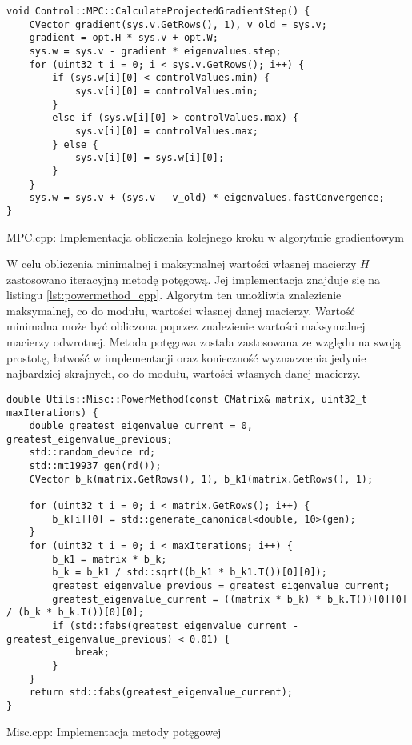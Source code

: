 \begin{listing}[htb]
\begin{verbatim}
void Control::MPC::CalculateProjectedGradientStep() {
    CVector gradient(sys.v.GetRows(), 1), v_old = sys.v;
    gradient = opt.H * sys.v + opt.W;
    sys.w = sys.v - gradient * eigenvalues.step;
    for (uint32_t i = 0; i < sys.v.GetRows(); i++) {
        if (sys.w[i][0] < controlValues.min) {
            sys.v[i][0] = controlValues.min;
        }
        else if (sys.w[i][0] > controlValues.max) {
            sys.v[i][0] = controlValues.max;
        } else {
            sys.v[i][0] = sys.w[i][0];
        }
    }
    sys.w = sys.v + (sys.v - v_old) * eigenvalues.fastConvergence;
}
\end{verbatim}
\caption{MPC.cpp: Implementacja obliczenia kolejnego kroku w algorytmie gradientowym}
\label{lst:step_cpp}
\end{listing}
    
W celu obliczenia minimalnej i maksymalnej wartości własnej macierzy $H$ zastosowano iteracyjną
metodę potęgową. Jej implementacja znajduje się na listingu \ref{lst:powermethod_cpp}. Algorytm
ten umożliwia znalezienie maksymalnej, co do modułu, wartości własnej danej macierzy. Wartość
minimalna może być obliczona poprzez znalezienie wartości maksymalnej macierzy odwrotnej. Metoda
potęgowa została zastosowana ze względu na swoją prostotę, łatwość w implementacji oraz konieczność
wyznaczcenia jedynie najbardziej skrajnych, co do modułu, wartości własnych danej macierzy. 
\begin{listing}[htb]
\begin{verbatim}
double Utils::Misc::PowerMethod(const CMatrix& matrix, uint32_t maxIterations) {
    double greatest_eigenvalue_current = 0, greatest_eigenvalue_previous;
    std::random_device rd;
    std::mt19937 gen(rd());
    CVector b_k(matrix.GetRows(), 1), b_k1(matrix.GetRows(), 1);

    for (uint32_t i = 0; i < matrix.GetRows(); i++) {
        b_k[i][0] = std::generate_canonical<double, 10>(gen);
    }
    for (uint32_t i = 0; i < maxIterations; i++) {
        b_k1 = matrix * b_k;
        b_k = b_k1 / std::sqrt((b_k1 * b_k1.T())[0][0]);
        greatest_eigenvalue_previous = greatest_eigenvalue_current;
        greatest_eigenvalue_current = ((matrix * b_k) * b_k.T())[0][0] / (b_k * b_k.T())[0][0];
        if (std::fabs(greatest_eigenvalue_current - greatest_eigenvalue_previous) < 0.01) {
            break;
        }
    }
    return std::fabs(greatest_eigenvalue_current);
}
\end{verbatim}
\caption{Misc.cpp: Implementacja metody potęgowej}
\label{lst:powermethod_cpp}
\end{listing}

